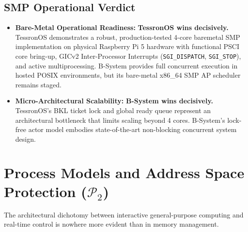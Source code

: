 \documentclass[10pt,journal,compsoc,twocolumn]{article}
\begin{document}
\subsection{SMP Operational Verdict}
\begin{itemize}[leftmargin=*]
    \item \textbf{Bare-Metal Operational Readiness:} \textbf{TessronOS wins decisively.} TessronOS demonstrates a robust, production-tested 4-core baremetal SMP implementation on physical Raspberry Pi 5 hardware with functional PSCI core bring-up, GICv2 Inter-Processor Interrupts (\texttt{SGI\_DISPATCH}, \texttt{SGI\_STOP}), and active multiprocessing. B-System provides full concurrent execution in hosted POSIX environments, but its bare-metal x86\_64 SMP AP scheduler remains staged.
    \item \textbf{Micro-Architectural Scalability:} \textbf{B-System wins decisively.} TessronOS's BKL ticket lock and global ready queue represent an architectural bottleneck that limits scaling beyond 4 cores. B-System's lock-free actor model embodies state-of-the-art non-blocking concurrent system design.
\end{itemize}

\section{Process Models and Address Space Protection ($\mathcal{P}_2$)}
\label{sec:mmu}

The architectural dichotomy between interactive general-purpose computing and real-time control is nowhere more evident than in memory management.
\end{document}

